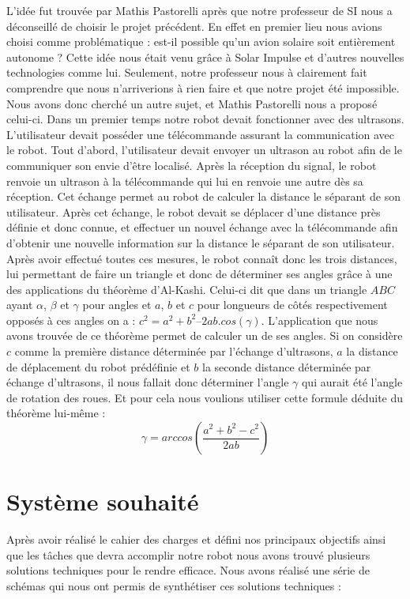 \documentclass[12pt,a4paper]{article}
\begin{document}
\indent\indent L’idée fut trouvée par Mathis Pastorelli après que notre professeur de SI nous a déconseillé de choisir le projet précédent.
En effet en premier lieu nous avions choisi comme problématique : est-il possible qu’un avion solaire soit entièrement autonome ? Cette idée nous était venu grâce à Solar Impulse et d’autres nouvelles technologies comme lui. Seulement, notre professeur nous à clairement fait comprendre que nous n’arriverions à rien faire et que notre projet été impossible. Nous avons donc cherché un  autre sujet, et Mathis Pastorelli nous a proposé celui-ci. 
Dans un premier temps notre robot devait fonctionner avec des ultrasons. L’utilisateur devait posséder une télécommande assurant la communication avec le robot. Tout d’abord, l’utilisateur devait envoyer un ultrason au robot afin de le communiquer son envie d’être localisé. Après la réception du signal, le robot renvoie un ultrason à la télécommande qui lui en renvoie une autre dès sa réception. Cet échange permet au robot de calculer la distance le séparant de son utilisateur. Après cet échange, le robot devait se déplacer d’une distance près définie et donc connue, et effectuer un nouvel échange avec la télécommande afin d’obtenir une nouvelle information sur la distance le séparant de son utilisateur. Après avoir effectué toutes ces mesures, le robot connaît donc les trois distances, lui permettant de faire un triangle et donc de déterminer ses angles grâce à une des applications du théorème d’Al-Kashi. Celui-ci dit que dans un triangle $ABC$ ayant $\alpha$, $\beta$ et $\gamma$ pour angles et $a$, $b$ et $c$ pour longueurs de côtés respectivement opposés à ces angles on a : $c^2 = a^2 + b^2 – 2ab.cos(\gamma)$. L'application que nous avons trouvée de ce théorème permet de calculer un de ses angles. Si on considère $c$ comme la première distance déterminée par l’échange d’ultrasons, $a$ la distance de déplacement du robot prédéfinie et $b$  la seconde distance déterminée par échange d’ultrasons, il nous fallait donc déterminer l’angle $\gamma$ qui aurait été l’angle de rotation des roues. Et pour cela nous voulions utiliser cette formule déduite du théorème lui-même : $$\gamma = arccos\left(\dfrac{a^2 + b^2 - c^2}{2ab}\right) $$
	\newpage
	\section{Système souhaité}
	
	Après avoir réalisé le cahier des charges et défini nos principaux objectifs ainsi que les tâches que devra accomplir notre robot nous avons trouvé plusieurs solutions techniques pour le rendre efficace.
Nous avons réalisé une série de schémas qui nous ont permis de synthétiser ces solutions techniques :
\end{document}
